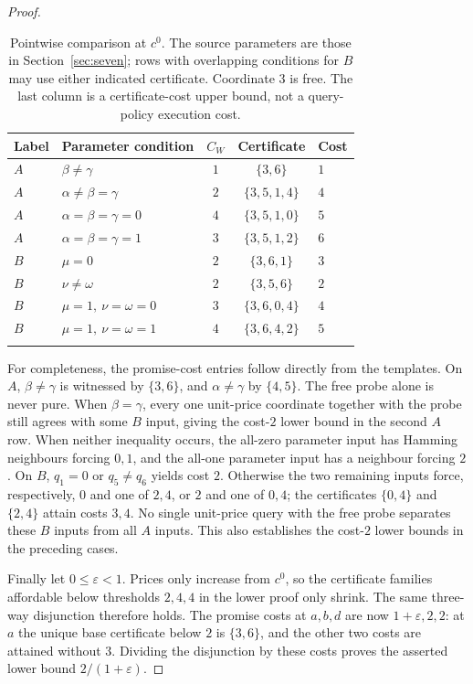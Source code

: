 \documentclass[pdflatex,sn-mathphys-num]{sn-jnl}
\theoremstyle{thmstyleone}
\theoremstyle{thmstylethree}
\theoremstyle{thmstyletwo}
\begin{document}
\begin{proof}
\begin{table}[htbp]
\centering
\caption{Pointwise comparison at $c^0$. The source parameters are
those in Section~\ref{sec:seven}; rows with overlapping conditions
for $B$ may use either indicated certificate. Coordinate $3$ is free.
The last column is a certificate-cost upper bound, not a query-policy
execution cost.}\label{tab:certificate-inflation}
\begin{tabular}{@{}llccl@{}}
\toprule
Label & Parameter condition & $C_W$ & Certificate & Cost\\
\midrule
$A$ & $\beta\ne\gamma$ & $1$ & $\{3,6\}$ & $1$\\
$A$ & $\alpha\ne\beta=\gamma$ & $2$ & $\{3,5,1,4\}$ & $4$\\
$A$ & $\alpha=\beta=\gamma=0$ & $4$ & $\{3,5,1,0\}$ & $5$\\
$A$ & $\alpha=\beta=\gamma=1$ & $3$ & $\{3,5,1,2\}$ & $6$\\
\midrule
$B$ & $\mu=0$ & $2$ & $\{3,6,1\}$ & $3$\\
$B$ & $\nu\ne\omega$ & $2$ & $\{3,5,6\}$ & $2$\\
$B$ & $\mu=1,\ \nu=\omega=0$ & $3$ & $\{3,6,0,4\}$ & $4$\\
$B$ & $\mu=1,\ \nu=\omega=1$ & $4$ & $\{3,6,4,2\}$ & $5$\\
\botrule
\end{tabular}
\end{table}

For completeness, the promise-cost entries follow directly from
the templates. On $A$, $\beta\ne\gamma$ is witnessed by $\{3,6\}$,
and $\alpha\ne\gamma$ by $\{4,5\}$. The free probe alone is never
pure. When $\beta=\gamma$, every one unit-price coordinate together
with the probe still agrees with some $B$ input, giving the cost-$2$
lower bound in the second $A$ row. When neither inequality occurs, the all-zero
parameter input has Hamming neighbours forcing $0,1$, and the all-one
parameter input has a neighbour forcing $2$. On $B$, $q_1=0$ or
$q_5\ne q_6$ yields cost $2$. Otherwise the two remaining inputs
force, respectively, $0$ and one of $2,4$, or $2$ and one of $0,4$;
the certificates $\{0,4\}$ and $\{2,4\}$ attain costs $3,4$.
No single unit-price query with the free probe separates these $B$
inputs from all $A$ inputs. This also establishes the cost-$2$
lower bounds in the preceding cases.

Finally let $0\leq\varepsilon<1$. Prices only increase from $c^0$,
so the certificate families affordable below thresholds $2,4,4$
in the lower proof only shrink. The same three-way disjunction
therefore holds. The promise costs at $a,b,d$ are now
$1+\varepsilon,2,2$: at $a$ the unique base certificate below $2$
is $\{3,6\}$, and the other two costs are attained without $3$.
Dividing the disjunction by these costs proves the asserted lower
bound $2/(1+\varepsilon)$.
\end{proof}
\end{document}
